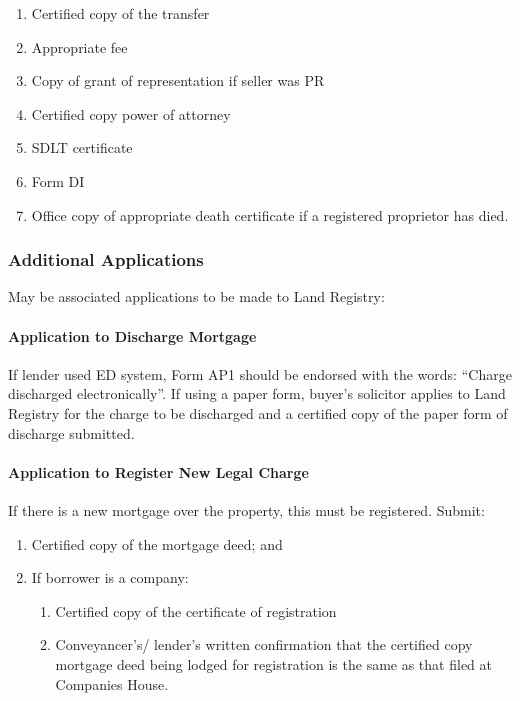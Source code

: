 \documentclass[
]{article}
\providecommand{\tightlist}{%
  \setlength{\itemsep}{0pt}\setlength{\parskip}{0pt}}
\begin{document}
\begin{enumerate}
\def\labelenumi{\arabic{enumi}.}
\tightlist
\item
  Certified copy of the transfer
\item
  Appropriate fee
\item
  Copy of grant of representation if seller was PR
\item
  Certified copy power of attorney
\item
  SDLT certificate
\item
  Form DI
\item
  Office copy of appropriate death certificate if a registered
  proprietor has died.
\end{enumerate}

\hypertarget{additional-applications}{%
\subsubsection{Additional Applications}\label{additional-applications}}

May be associated applications to be made to Land Registry:

\hypertarget{application-to-discharge-mortgage}{%
\paragraph{Application to Discharge
Mortgage}\label{application-to-discharge-mortgage}}

If lender used ED system, Form AP1 should be endorsed with the words:
``Charge discharged electronically''. If using a paper form, buyer's
solicitor applies to Land Registry for the charge to be discharged and a
certified copy of the paper form of discharge submitted.

\hypertarget{application-to-register-new-legal-charge}{%
\paragraph{Application to Register New Legal
Charge}\label{application-to-register-new-legal-charge}}

If there is a new mortgage over the property, this must be registered.
Submit:

\begin{enumerate}
\def\labelenumi{\arabic{enumi}.}
\tightlist
\item
  Certified copy of the mortgage deed; and
\item
  If borrower is a company:

  \begin{enumerate}
  \def\labelenumii{\arabic{enumii}.}
  \tightlist
  \item
    Certified copy of the certificate of registration
  \item
    Conveyancer's/ lender's written confirmation that the certified copy
    mortgage deed being lodged for registration is the same as that
    filed at Companies House.
  \end{enumerate}
\end{enumerate}
\end{document}
